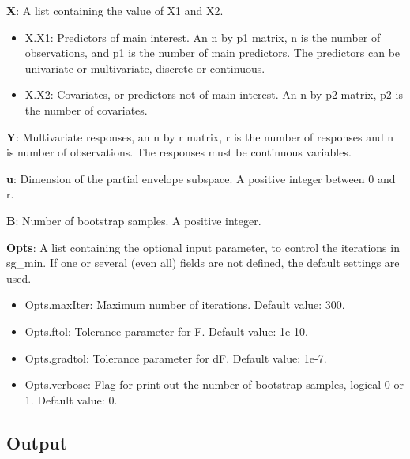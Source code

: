 \documentclass[a4paper,11pt,openany]{memoir}
\begin{document}
\begin{par}
\textbf{X}: A list containing the value of X1 and X2.
\end{par} \vspace{1em}
\begin{itemize}
\setlength{\itemsep}{-1ex}
   \item X.X1: Predictors of main interest. An n by p1 matrix, n is the number of observations, and p1 is the number of main predictors. The predictors can be univariate or multivariate, discrete or continuous.
   \item X.X2: Covariates, or predictors not of main interest.  An n by p2 matrix, p2 is the number of covariates.
\end{itemize}
\begin{par}
\textbf{Y}: Multivariate responses, an n by r matrix, r is the number of responses and n is number of observations.  The responses must be continuous variables.
\end{par} \vspace{1em}
\begin{par}
\textbf{u}: Dimension of the partial envelope subspace.  A positive integer between 0 and r.
\end{par} \vspace{1em}
\begin{par}
\textbf{B}: Number of bootstrap samples.  A positive integer.
\end{par} \vspace{1em}
\begin{par}
\textbf{Opts}: A list containing the optional input parameter, to control the iterations in sg\_min. If one or several (even all) fields are not defined, the default settings are used.
\end{par} \vspace{1em}
\begin{itemize}
\setlength{\itemsep}{-1ex}
   \item Opts.maxIter: Maximum number of iterations.  Default value: 300.
   \item Opts.ftol: Tolerance parameter for F.  Default value: 1e-10.
   \item Opts.gradtol: Tolerance parameter for dF.  Default value: 1e-7.
   \item Opts.verbose: Flag for print out the number of bootstrap samples, logical 0 or 1. Default value: 0.
\end{itemize}


\subsection*{Output}
\end{document}

